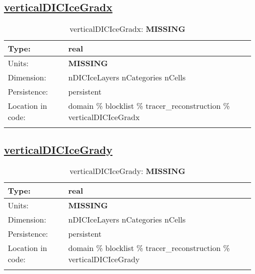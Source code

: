 \subsection[verticalDICIceGradx]{\hyperref[sec:var_tab_tracer_reconstruction]{verticalDICIceGradx}}
\label{subsec:var_sec_tracer_reconstruction_verticalDICIceGradx}
\begin{center}
\begin{longtable}{| p{2.0in} | p{4.0in} |}
        \hline 
        Type: & real \\
        \hline 
        Units: & {\bf \color{red} MISSING} \\
        \hline 
        Dimension: & nDICIceLayers nCategories nCells \\
        \hline 
        Persistence: & persistent \\
        \hline 
         Location in code: & domain \% blocklist \% tracer\_reconstruction \% verticalDICIceGradx \\
         \hline 
    \caption{verticalDICIceGradx: {\bf \color{red} MISSING}}
\end{longtable}
\end{center}
\subsection[verticalDICIceGrady]{\hyperref[sec:var_tab_tracer_reconstruction]{verticalDICIceGrady}}
\label{subsec:var_sec_tracer_reconstruction_verticalDICIceGrady}
\begin{center}
\begin{longtable}{| p{2.0in} | p{4.0in} |}
        \hline 
        Type: & real \\
        \hline 
        Units: & {\bf \color{red} MISSING} \\
        \hline 
        Dimension: & nDICIceLayers nCategories nCells \\
        \hline 
        Persistence: & persistent \\
        \hline 
         Location in code: & domain \% blocklist \% tracer\_reconstruction \% verticalDICIceGrady \\
         \hline 
    \caption{verticalDICIceGrady: {\bf \color{red} MISSING}}
\end{longtable}
\end{center}
